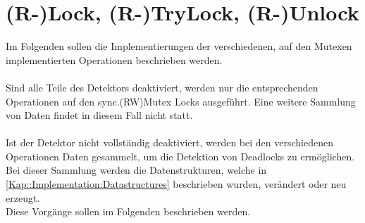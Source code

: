 \section{(R-)Lock, (R-)TryLock, (R-)Unlock}
Im Folgenden sollen die Implementierungen der verschiedenen, auf den Mutexen
implementierten Operationen beschrieben werden.\\\\ 
Sind alle Teile des Detektors deaktiviert, werden nur die entsprechenden 
Operationen auf den sync.(RW)Mutex Locks ausgeführt. Eine weitere Sammlung von Daten
findet in diesem Fall nicht statt.\\\\
Ist der Detektor nicht vollständig deaktiviert, werden bei den verschiedenen 
Operationen Daten gesammelt, um die Detektion von Deadlocks zu ermöglichen.  
Bei dieser Sammlung werden die Datenstrukturen,
welche in \ref{Kap::Implementation:Datastructures} beschrieben wurden, verändert
oder neu erzeugt.\\
Diese Vorgänge sollen im Folgenden beschrieben werden.
